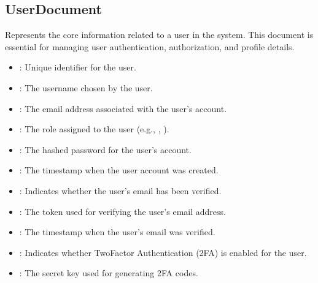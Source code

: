 \documentclass[letterpaper,10pt,english]{sphinxmanual}
\begin{document}
\subsection{UserDocument}
\label{\detokenize{administration_concession_system/authorization_service:userdocument}}
\sphinxAtStartPar
Represents the core information related to a user in the system. This document is essential for managing user authentication, authorization, and profile details.
\begin{itemize}
\item {} 
\sphinxAtStartPar
{}: 
\sphinxhyphen{} Unique identifier for the user.

\item {} 
\sphinxAtStartPar
{}: 
\sphinxhyphen{} The username chosen by the user.

\item {} 
\sphinxAtStartPar
{}: 
\sphinxhyphen{} The email address associated with the user’s account.

\item {} 
\sphinxAtStartPar
{}: 
\sphinxhyphen{} The role assigned to the user (e.g., , ).

\item {} 
\sphinxAtStartPar
{}: 
\sphinxhyphen{} The hashed password for the user’s account.

\item {} 
\sphinxAtStartPar
{}: 
\sphinxhyphen{} The timestamp when the user account was created.

\item {} 
\sphinxAtStartPar
{}: 
\sphinxhyphen{} Indicates whether the user’s email has been verified.

\item {} 
\sphinxAtStartPar
{}: 
\sphinxhyphen{} The token used for verifying the user’s email address.

\item {} 
\sphinxAtStartPar
{}: 
\sphinxhyphen{} The timestamp when the user’s email was verified.

\item {} 
\sphinxAtStartPar
{}: 
\sphinxhyphen{} Indicates whether Two\sphinxhyphen{}Factor Authentication (2FA) is enabled for the user.

\item {} 
\sphinxAtStartPar
{}: 
\sphinxhyphen{} The secret key used for generating 2FA codes.

\end{itemize}
\end{document}
